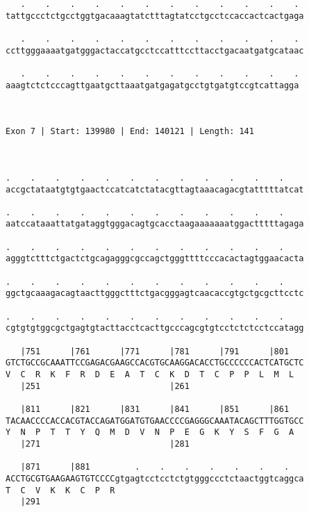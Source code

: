 \documentclass{article}
\begin{document}
\begin{Verbatim}
   .    .    .    .    .    .    .    .    .    .    .    . 
tattgccctctgcctggtgacaaagtatctttagtatcctgcctccaccactcactgaga
                                                            
   .    .    .    .    .    .    .    .    .    .    .    . 
ccttgggaaaatgatgggactaccatgcctccatttccttacctgacaatgatgcataac
                                                            
   .    .    .    .    .    .    .    .    .    .    .    .
aaagtctctcccagttgaatgcttaaatgatgagatgcctgtgatgtccgtcattagga
                                                           
                                                           
 
Exon 7 | Start: 139980 | End: 140121 | Length: 141



.    .    .    .    .    .    .    .    .    .    .    .    
accgctataatgtgtgaactccatcatctatacgttagtaaacagacgtatttttatcat
                                                            
.    .    .    .    .    .    .    .    .    .    .    .    
aatccataaattatgataggtgggacagtgcacctaagaaaaaaatggactttttagaga
                                                            
.    .    .    .    .    .    .    .    .    .    .    .    
agggtctttctgactctgcagagggcgccagctgggttttcccacactagtggaacacta
                                                            
.    .    .    .    .    .    .    .    .    .    .    .    
ggctgcaaagacagtaacttgggctttctgacgggagtcaacaccgtgctgcgcttcctc
                                                            
.    .    .    .    .    .    .    .    .    .    .    .    
cgtgtgtggcgctgagtgtacttacctcacttgcccagcgtgtcctctctcctccatagg
                                                            
   |751      |761      |771      |781      |791      |801   
GTCTGCCGCAAATTCCGAGACGAAGCCACGTGCAAGGACACCTGCCCCCCACTCATGCTC
V  C  R  K  F  R  D  E  A  T  C  K  D  T  C  P  P  L  M  L  
   |251                          |261                       
  
   |811      |821      |831      |841      |851      |861   
TACAACCCCACCACGTACCAGATGGATGTGAACCCCGAGGGCAAATACAGCTTTGGTGCC
Y  N  P  T  T  Y  Q  M  D  V  N  P  E  G  K  Y  S  F  G  A  
   |271                          |281                       
  
   |871      |881         .    .    .    .    .    .    .   
ACCTGCGTGAAGAAGTGTCCCCgtgagtcctcctctgtgggccctctaactggtcaggca
T  C  V  K  K  C  P  R                                      
   |291                                                     
  

\end{Verbatim}
\end{document}
